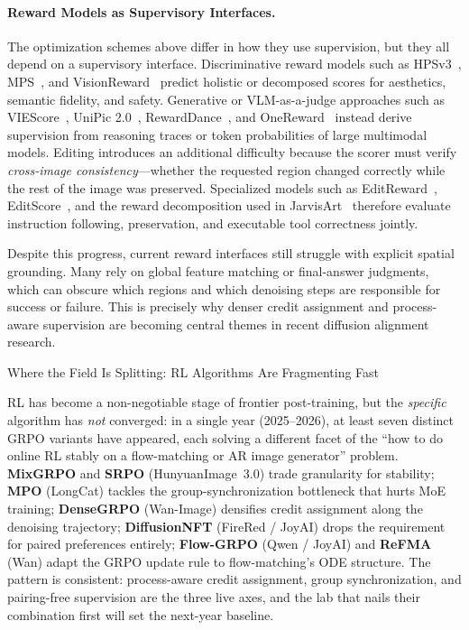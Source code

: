 \paragraph{Reward Models as Supervisory Interfaces.}
The optimization schemes above differ in how they use supervision, but they all depend on a supervisory interface. Discriminative reward models such as HPSv3~\citep{ma2025hpsv3}, MPS~\citep{zhang2024learning}, and VisionReward~\citep{xu2024visionreward} predict holistic or decomposed scores for aesthetics, semantic fidelity, and safety. Generative or VLM-as-a-judge approaches such as VIEScore~\citep{ku2024viescore}, UniPic 2.0~\citep{wei2025skywork}, RewardDance~\citep{wu2025rewarddance}, and OneReward~\citep{gong2025onereward} instead derive supervision from reasoning traces or token probabilities of large multimodal models. Editing introduces an additional difficulty because the scorer must verify \emph{cross-image consistency}---whether the requested region changed correctly while the rest of the image was preserved. Specialized models such as EditReward~\citep{wu2025editreward}, EditScore~\citep{luo2025editscore}, and the reward decomposition used in JarvisArt~\citep{lin2025jarvisart} therefore evaluate instruction following, preservation, and executable tool correctness jointly.

Despite this progress, current reward interfaces still struggle with explicit spatial grounding. Many rely on global feature matching or final-answer judgments, which can obscure which regions and which denoising steps are responsible for success or failure. This is precisely why denser credit assignment and process-aware supervision are becoming central themes in recent diffusion alignment research.

\begin{highlightbox}{Where the Field Is Splitting: RL Algorithms Are Fragmenting Fast}

RL has become a non-negotiable stage of frontier post-training, but the \emph{specific} algorithm has \emph{not} converged: in a single year (2025--2026), at least seven distinct GRPO variants have appeared, each solving a different facet of the ``how to do online RL stably on a flow-matching or AR image generator'' problem. \textbf{MixGRPO} and \textbf{SRPO} (HunyuanImage~3.0) trade granularity for stability; \textbf{MPO} (LongCat) tackles the group-synchronization bottleneck that hurts MoE training; \textbf{DenseGRPO} (Wan-Image) densifies credit assignment along the denoising trajectory; \textbf{DiffusionNFT} (FireRed / JoyAI) drops the requirement for paired preferences entirely; \textbf{Flow-GRPO} (Qwen / JoyAI) and \textbf{ReFMA} (Wan) adapt the GRPO update rule to flow-matching's ODE structure. The pattern is consistent: process-aware credit assignment, group synchronization, and pairing-free supervision are the three live axes, and the lab that nails their combination first will set the next-year baseline.
\end{highlightbox}




